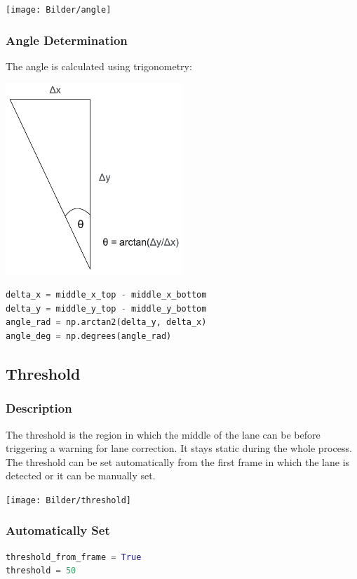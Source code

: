 \documentclass[12pt]{article}
\begin{document}
\begin{center}
\texttt{[image: Bilder/angle]}
\end{center}
\newpage

\subsubsection*{Angle Determination}
The angle is calculated using trigonometry:

\begin{center}
\includegraphics[width=0.5\textwidth]{Bilder/trig}
\end{center}


\begin{lstlisting}[language=Python]
delta_x = middle_x_top - middle_x_bottom
delta_y = middle_y_top - middle_y_bottom
angle_rad = np.arctan2(delta_y, delta_x)
angle_deg = np.degrees(angle_rad)
\end{lstlisting}


\subsection{Threshold}

\subsubsection*{Description}
The threshold is the region in which the middle of the lane can be before triggering a warning for lane correction. It stays static during the whole process. The threshold can be set automatically from the first frame in which the lane is detected or it can be manually set. 
\begin{center}
\texttt{[image: Bilder/threshold]}
\end{center}

\subsubsection*{Automatically Set}
\begin{lstlisting}[language=Python]
threshold_from_frame = True
threshold = 50 
\end{lstlisting}
\end{document}
